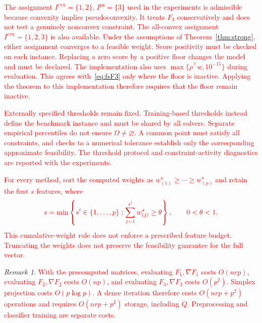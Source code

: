 \documentclass[]{interact}
\theoremstyle{plain}
\theoremstyle{definition}
\theoremstyle{remark}
\newtheorem{remark}{Remark}
\newcommand{\cvx}{\mathrm{cvx}}
\newcommand{\ps}{\mathrm{ps}}
\begin{document}
\leavevmode\textcolor{red}{The assignment $I^{\cvx}=\{1,2\}$, $I^{\ps}=\{3\}$ used in the experiments is admissible because convexity implies pseudoconvexity. It treats $F_3$ conservatively and does not test a genuinely nonconvex constraint. The all-convex assignment $I^{\cvx}=\{1,2,3\}$ is also available. Under the assumptions of Theorem~\ref{thm:strong}, either assignment converges to a feasible weight. Score positivity must be checked on each instance. Replacing a zero score by a positive floor changes the model and must be declared. The implementation also uses $\max\{\rho^{\top}w,10^{-15}\}$ during evaluation. This agrees with~\eqref{eq:fsF3} only where the floor is inactive. Applying the theorem to this implementation therefore requires that the floor remain inactive.}

\leavevmode\textcolor{red}{Externally specified thresholds remain fixed. Training-based thresholds instead define the benchmark instance and must be shared by all solvers. Separate empirical percentiles do not ensure $\Omega\ne\varnothing$. A common point must satisfy all constraints, and checks to a numerical tolerance establish only the corresponding approximate feasibility. The threshold protocol and constraint-activity diagnostics are reported with the experiments.}

\leavevmode\textcolor{red}{For every method, sort the computed weights as $w^\star_{(1)}\ge\cdots\ge w^\star_{(p)}$ and retain the first $s$ features, where}
\begin{equation}\label{eq:thetaRule}\textcolor{red}{
s=\min\left\{s'\in\{1,\ldots,p\}:\sum_{j=1}^{s'}w^\star_{(j)}\ge\theta\right\},\qquad 0<\theta<1.
}\end{equation}
\leavevmode\textcolor{red}{This cumulative-weight rule does not enforce a prescribed feature budget. Truncating the weights does not preserve the feasibility guarantee for the full vector.}

\begin{remark}\label{rem:fs-cost}
\leavevmode\textcolor{red}{With the precomputed matrices, evaluating $F_1,\nabla F_1$ costs $O(nrp)$, evaluating $F_2,\nabla F_2$ costs $O(np)$, and evaluating $F_3,\nabla F_3$ costs $O(p^2)$. Simplex projection costs $O(p\log p)$. A dense iteration therefore costs $O(nrp+p^2)$ operations and requires $O(nrp+p^2)$ storage, including $Q$. Preprocessing and classifier training are separate costs.}
\end{remark}
\end{document}
